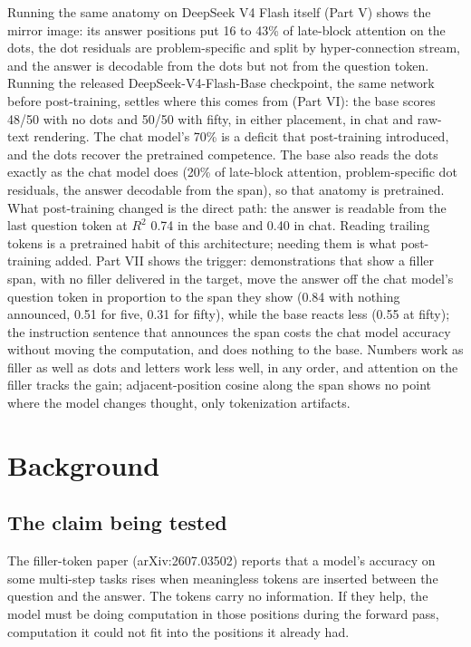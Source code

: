 \documentclass[11pt]{article}
\begin{document}
Running the same anatomy on DeepSeek V4 Flash itself (Part V) shows the mirror image: its answer positions put 16 to 43\% of late-block attention on the dots, the dot residuals are problem-specific and split by hyper-connection stream, and the answer is decodable from the dots but not from the question token. Running the released DeepSeek-V4-Flash-Base checkpoint, the same network before post-training, settles where this comes from (Part VI): the base scores 48/50 with no dots and 50/50 with fifty, in either placement, in chat and raw-text rendering. The chat model's 70\% is a deficit that post-training introduced, and the dots recover the pretrained competence. The base also reads the dots exactly as the chat model does (20\% of late-block attention, problem-specific dot residuals, the answer decodable from the span), so that anatomy is pretrained. What post-training changed is the direct path: the answer is readable from the last question token at $R^2$ 0.74 in the base and 0.40 in chat. Reading trailing tokens is a pretrained habit of this architecture; needing them is what post-training added. Part VII shows the trigger: demonstrations that show a filler span, with no filler delivered in the target, move the answer off the chat model's question token in proportion to the span they show (0.84 with nothing announced, 0.51 for five, 0.31 for fifty), while the base reacts less (0.55 at fifty); the instruction sentence that announces the span costs the chat model accuracy without moving the computation, and does nothing to the base. Numbers work as filler as well as dots and letters work less well, in any order, and attention on the filler tracks the gain; adjacent-position cosine along the span shows no point where the model changes thought, only tokenization artifacts.

\tableofcontents

\section{Background}

\subsection{The claim being tested}

The filler-token paper (arXiv:2607.03502) reports that a model's accuracy on some multi-step tasks rises when meaningless tokens are inserted between the question and the answer. The tokens carry no information. If they help, the model must be doing computation in those positions during the forward pass, computation it could not fit into the positions it already had.
\end{document}
